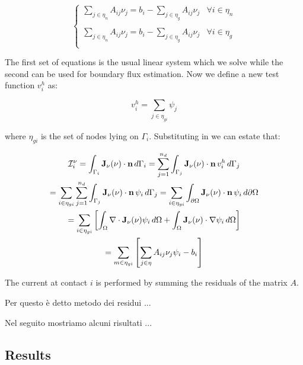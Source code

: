 \begin{equation}
\label{eq: discretization before bc 2}
\begin{cases}

\sum_{j\in\eta_n} A_{ij} \nu_j = b_i - \sum_{j\in\eta_g} A_{ij} \nu_j & \forall i \in \eta_n \\
\\
\sum_{j\in\eta_n} A_{ij} \nu_j = b_i - \sum_{j\in\eta_g} A_{ij} \nu_j & \forall i \in \eta_g \\

\end{cases}
\end{equation}

The first set of equations is the usual linear system which we solve while the second can be used for boundary flux estimation. 
 Now we define a new test function $v^h_i$ as:

\begin{equation}
\label{eq: new test function}
v^h_i=\sum_{j\in\eta_{gi} }\psi_j
\end{equation}

where $\eta_{gi}$ is the set of nodes lying on $\Gamma_i$. Substituting  in  we can estate that:

\begin{multline}
\mathcal{I}_i^\nu 
= \int_{\Gamma_i}\mathbf{J}_\nu(\nu) \cdot \mathbf{n} \, d{\Gamma_i}
= \sum_{j=1}^{n_d}\int_{\Gamma_j}\mathbf{J}_\nu(\nu) \cdot \mathbf{n} \,v_i^h \, d{\Gamma_j} \\
=\sum_{i\in\eta_{gi}}\sum_{j=1}^{n_d}\int_{\Gamma_j}\mathbf{J}_\nu(\nu) \cdot \mathbf{n} \, \psi_i \, d{\Gamma_j} 
= \sum_{i\in \eta_{gi}}\int_{\partial \Omega}\mathbf{J}_\nu(\nu) \cdot \mathbf{n} \, \psi_i \, d{\partial \Omega} \\
= \sum_{i\in \eta_{gi}} \left[ \int_{\Omega}\nabla \cdot \mathbf{J}_\nu(\nu) \psi_i \, d{\Omega} + \int_{\Omega}\mathbf{J}_\nu(\nu) \cdot \nabla\psi_i \, d{\Omega} \right] \\
= \sum_{m\in \eta_{gi}} \left[ \sum_{j\in\eta} A_{ij} \nu_j\psi_i - b_i  \right] \\
\end{multline}

The current at contact $i$ is performed by summing the residuals of the matrix $A$.

Per questo è detto metodo dei residui ...

Nel seguito mostriamo alcuni risultati ...

\subsection{Results}

